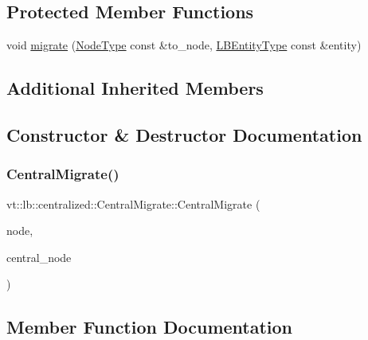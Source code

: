 \subsection*{Protected Member Functions}
\begin{DoxyCompactItemize}
\item 
void \hyperlink{structvt_1_1lb_1_1centralized_1_1_central_migrate_ac71e322fccc6b6cceefb3f74e9d8e311}{migrate} (\hyperlink{namespacevt_a866da9d0efc19c0a1ce79e9e492f47e2}{Node\+Type} const \&to\+\_\+node, \hyperlink{namespacevt_a92ec26fb6644cd0ba7eb0ee70c96bee5}{L\+B\+Entity\+Type} const \&entity)
\end{DoxyCompactItemize}
\subsection*{Additional Inherited Members}


\subsection{Constructor \& Destructor Documentation}
\mbox{\label{structvt_1_1lb_1_1centralized_1_1_central_migrate_a29ed99ed374932cc6340611b3c7b34d7}} 
\subsubsection{\texorpdfstring{Central\+Migrate()}{CentralMigrate()}}
{\footnotesize\ttfamily vt\+::lb\+::centralized\+::\+Central\+Migrate\+::\+Central\+Migrate (\begin{DoxyParamCaption}\item[{\hyperlink{namespacevt_a866da9d0efc19c0a1ce79e9e492f47e2}{Node\+Type} const \&}]{node,  }\item[{\hyperlink{namespacevt_a866da9d0efc19c0a1ce79e9e492f47e2}{Node\+Type} const \&}]{central\+\_\+node }\end{DoxyParamCaption})\hspace{0.3cm}{\ttfamily [inline]}}



\subsection{Member Function Documentation}
\mbox{\label{structvt_1_1lb_1_1centralized_1_1_central_migrate_a61e43342afb57a3f15bf8889244250d2}} 
